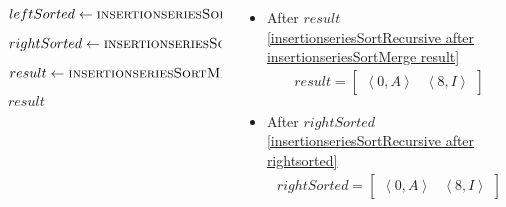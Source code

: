 \begin{frame}[containsverbatim]{\insertionseriesexampleframe}
\begin{columns}[c]
\begin{column}{0.4\textwidth}
{\begin{minipage}[c]{\textwidth}
\begin{algorithm}[H]
\begin{algorithmic}[1]
                                            \label{insertionseriesSortRecursive before leftSorted}
                                            \State $leftSorted \gets \Call{insertionseriesSortRecursive}{left}$
                                            \label{insertionseriesSortRecursive after leftsorted}
                                            
                                            \label{insertionseriesSortRecursive before rightSorted}
                                            \State $rightSorted \gets \Call{insertionseriesSortRecursive}{right}$
                                            \label{insertionseriesSortRecursive after rightsorted}
                                            
                                            \label{insertionseriesSortRecursive before insertionseriesSortMerge result}
                                            \State $result \gets \Call{insertionseriesSortMerge}{leftSorted, rightSorted}$
                                            \label{insertionseriesSortRecursive after insertionseriesSortMerge result}
                    
                                            \State \Return $result$
                                        \EndFunction
                                    \end{algorithmic}
                                \end{algorithm}
                            \endgroup
                        \end{minipage}
                    }
                \end{column}

                \begin{column}{0.6\textwidth}
                    \tiny
                        \begin{itemize}
                            \item After $result$ \cref{insertionseriesSortRecursive after insertionseriesSortMerge result}
                            \begin{align*}
                                result = \begin{bmatrix}\left<0, A\right> & \left<8, I\right>\end{bmatrix}
                            \end{align*}

                            \item After $rightSorted$ \cref{insertionseriesSortRecursive after rightsorted}
                            \begin{align*}
                                rightSorted = \begin{bmatrix}\left<0, A\right> & \left<8, I\right>\end{bmatrix}
                            \end{align*}


\end{itemize}
\end{column}
\end{columns}
\end{frame}
